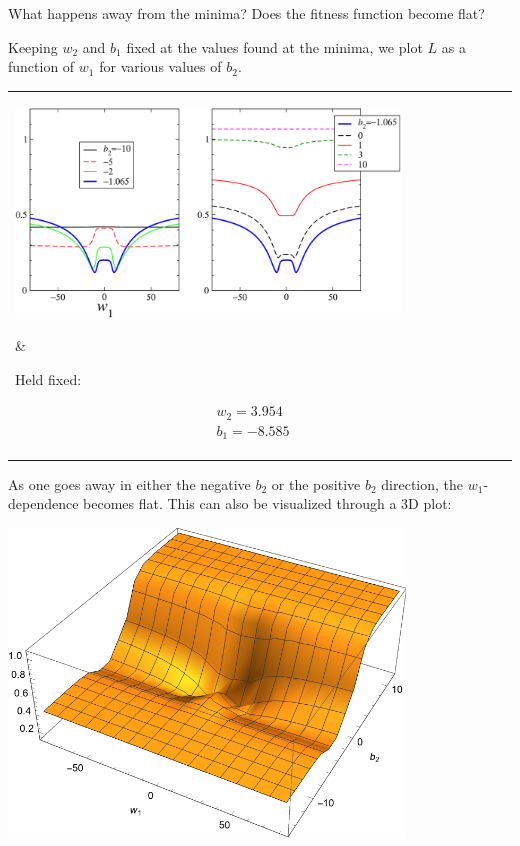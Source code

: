 \documentclass[12pt,a4paper]{article}
\begin{document}
What happens away from the minima?  Does the fitness function become flat?  

Keeping $w_2$ and $b_1$ fixed at the values found at the minima, we plot $L$ as a function of $w_1$
for various values of $b_2$.  


\smallskip


\begin{center}
\begin{tabular}{ll}
%
\parbox{0.82\textwidth}{ 
%

\begin{flushleft}
\includegraphics[width=0.81\textwidth]{Images/3node_largedomain_fitness_vs_w1_varyb2_a_01.pdf}
\end{flushleft}


} &   \hspace{-0.01\textwidth}
\parbox{0.16\textwidth}{ \centering

Held fixed: 

\begin{gather*}
  w_2 = 3.954
  \\
  b_1 = -8.585
\end{gather*}


} 
\\
\end{tabular}
\end{center}


As one goes away in either the negative $b_2$ or the positive $b_2$ direction, the $w_1$-dependence
becomes flat.   This can also be visualized through a 3D plot:

\smallskip

\begin{center}
\includegraphics[width=0.79\textwidth]{Images/3node_largedomain_fitness_vs_w1_b2_3dplot.pdf}
\end{center}
\end{document}
